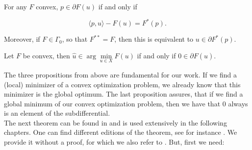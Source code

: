     \begin{proposition} %
    \label{prop:convex_subgradient}
        
        For any $F$ convex, $p \in \partial F(u)$ if and only if

            $$
                \langle p, u \rangle - F(u) = F^{\ast}(p).
            $$

        Moreover, if $F \in \Gamma_{0}$, so that $F^{\ast\ast} = F$, then this is equivalent to $u \in \partial F^{\ast}(p)$.

    \end{proposition}

    \begin{proposition} %
    \label{prop:zero_element_of_subgradient}
        
        Let $F$ be convex, then $\hat{u} \in \arg \min\limits_{u \in X} F(u)$ if and only if $0 \in \partial F(\hat{u})$.

    \end{proposition}

    The three propositions from above are fundamental for our work. If we find a (local) minimizer of a convex optimization problem, we already know that this minimizer is the global optimum. The last proposition assures, that if we find a global minimum of our convex optimization problem, then we have that $0$ always is an element of the subdifferential.\\ 
    The next theorem can be found in \cite{Rockafellar} and is used extensively in the following chapters. One can find different editions of the theorem, see for instance \cite{Yao-Liang-Yu}. We provide it without a proof, for which we also refer to \cite{Rockafellar}. But, first we need:

